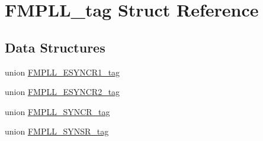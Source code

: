 \hypertarget{structFMPLL__tag}{}\section{F\+M\+P\+L\+L\+\_\+tag Struct Reference}
\label{structFMPLL__tag}
\subsection*{Data Structures}
\begin{DoxyCompactItemize}
\item 
union \mbox{\hyperlink{unionFMPLL__tag_1_1FMPLL__ESYNCR1__tag}{F\+M\+P\+L\+L\+\_\+\+E\+S\+Y\+N\+C\+R1\+\_\+tag}}
\item 
union \mbox{\hyperlink{unionFMPLL__tag_1_1FMPLL__ESYNCR2__tag}{F\+M\+P\+L\+L\+\_\+\+E\+S\+Y\+N\+C\+R2\+\_\+tag}}
\item 
union \mbox{\hyperlink{unionFMPLL__tag_1_1FMPLL__SYNCR__tag}{F\+M\+P\+L\+L\+\_\+\+S\+Y\+N\+C\+R\+\_\+tag}}
\item 
union \mbox{\hyperlink{unionFMPLL__tag_1_1FMPLL__SYNSR__tag}{F\+M\+P\+L\+L\+\_\+\+S\+Y\+N\+S\+R\+\_\+tag}}
\end{DoxyCompactItemize}
